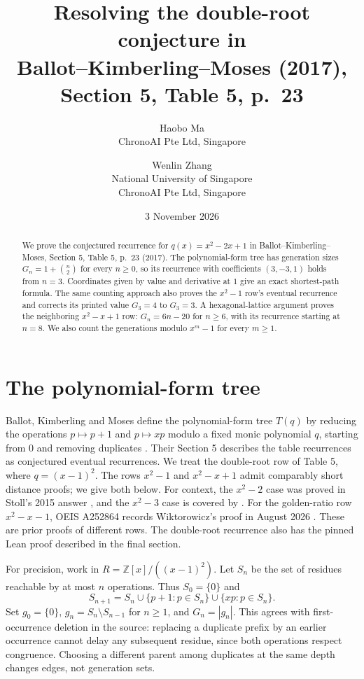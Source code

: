 \documentclass[11pt]{article}
\title{Resolving the double-root conjecture in\protect\\
Ballot--Kimberling--Moses (2017),\protect\\
Section 5, Table 5, p.~23}
\author{Haobo Ma\\\small ChronoAI Pte Ltd, Singapore
\and Wenlin Zhang\\\small National University of Singapore\\
\small ChronoAI Pte Ltd, Singapore}
\date{3 November 2026}
\newcommand{\ZZ}{\mathbb Z}
\begin{document}
\maketitle
\begin{abstract}
We prove the conjectured recurrence for $q(x)=x^2-2x+1$ in
Ballot--Kimberling--Moses, Section 5, Table 5, p.~23 (2017).
The polynomial-form tree has generation sizes $G_n=1+\binom n2$ for
every $n\geq0$, so its recurrence with coefficients $(3,-3,1)$ holds
from $n=3$. Coordinates given by value and derivative at $1$ give an
exact shortest-path formula. The same counting approach also proves
the $x^2-1$ row's eventual recurrence and corrects its printed value
$G_3=4$ to $G_3=3$. A hexagonal-lattice argument proves the neighboring
$x^2-x+1$ row: $G_n=6n-20$ for $n\geq6$, with its recurrence starting
at $n=8$. We also count the generations modulo $x^m-1$ for every $m\geq1$.
\end{abstract}

\section{The polynomial-form tree}
Ballot, Kimberling and Moses define the polynomial-form tree $T(q)$ by
reducing the operations $p\mapsto p+1$ and $p\mapsto xp$ modulo a fixed
monic polynomial $q$, starting from $0$ and removing duplicates
\cite[Section 1, pp.~15--17]{bkm}. Their Section 5 describes the table
recurrences as conjectured eventual recurrences. We treat the
double-root row of Table 5, where $q=(x-1)^2$.
The rows $x^2-1$ and $x^2-x+1$ admit comparably short distance proofs;
we give both below. For context, the $x^2-2$ case was proved in
Stoll's 2015 answer \cite{stoll}, and the $x^2-3$ case is covered by
\cite[Theorem 4.3]{bkm}. For the golden-ratio row $x^2-x-1$,
OEIS A252864 records Wiktorowicz's proof in August 2026
\cite{golden,wiktorowicz}. These are prior proofs of different rows.
The double-root recurrence also has the pinned Lean proof described
in the final section.

For precision, work in $R=\ZZ[x]/((x-1)^2)$. Let $S_n$ be the set of
residues reachable by at most $n$ operations. Thus $S_0=\{0\}$ and
\[
 S_{n+1}=S_n\cup\{p+1:p\in S_n\}\cup\{xp:p\in S_n\}.
\]
Set $g_0=\{0\}$, $g_n=S_n\setminus S_{n-1}$ for $n\geq1$, and
$G_n=|g_n|$. This agrees with first-occurrence deletion in the source:
replacing a duplicate prefix by an earlier occurrence cannot delay
any subsequent residue, since both operations respect congruence.
Choosing a different parent among duplicates at the same depth changes
edges, not generation sets.
\end{document}
